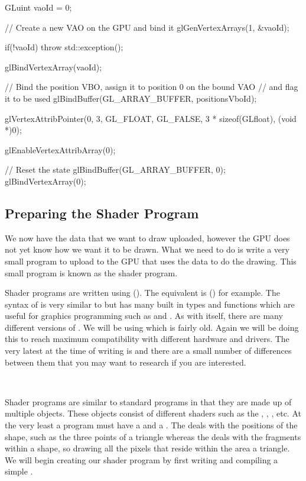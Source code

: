 \documentclass[10pt]{article}
\begin{document}
\begin{Code}
  GLuint vaoId = 0;

  // Create a new VAO on the GPU and bind it
  glGenVertexArrays(1, &vaoId);

  if(!vaoId)
  {
    throw std::exception();
  }

  glBindVertexArray(vaoId);

  // Bind the position VBO, assign it to position 0 on the bound VAO
  // and flag it to be used
  glBindBuffer(GL_ARRAY_BUFFER, positionsVboId);

  glVertexAttribPointer(0, 3, GL_FLOAT, GL_FALSE,
    3 * sizeof(GLfloat), (void *)0);

  glEnableVertexAttribArray(0);

  // Reset the state
  glBindBuffer(GL_ARRAY_BUFFER, 0);
  glBindVertexArray(0);
\end{Code}


\subsection*{Preparing the Shader Program}
We now have the data that we want to draw uploaded, however the GPU does
not yet know how we want it to be drawn. What we need to do is write
a very small program to upload to the GPU that uses the data to do the
drawing. This small program is known as the shader program.

Shader programs are written using 
(). The  equivalent is  () for example.  The syntax of 
is very similar to  but has many built in types and functions
which are useful for graphics programming such as  and
. As with  itself, there are many different
versions of . We will be using  which is fairly
old. Again we will be doing this to reach maximum compatibility with
different hardware and drivers. The very latest at the time of writing
is  and there are a small number of differences
between them that you may want to research if you are interested.

\

Shader programs are similar to standard  programs in that
they are made up of multiple objects. These objects consist of different
shaders such as the , ,
, etc. At the very least a program must have
a  and a . The  deals with the positions of the shape, such as the three points of
a triangle whereas the  deals with the fragments
within a shape, so drawing all the pixels that reside within the
area a triangle.  We will begin creating our shader program
by first writing and compiling a simple .
\end{document}

